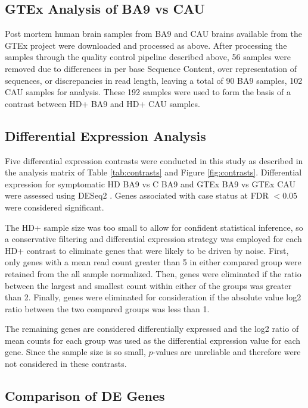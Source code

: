 \documentclass[fleqn,10pt,table]{wlscirep}
\begin{document}
\subsection{GTEx Analysis of BA9 vs CAU}
Post mortem human brain samples from BA9 and CAU brains available from the GTEx project \cite{Carithers2015-vh} were downloaded and processed as above.
After processing the samples through the quality control pipeline described above, 56 samples were removed due to differences in per base Sequence Content, over representation of sequences, or discrepancies in read length, leaving a total of 90 BA9 samples, 102 CAU samples for analysis.
These 192 samples were used to form the basis of a contrast between HD+ BA9 and HD+ CAU samples.

\subsection{Differential Expression Analysis}
Five differential expression contrasts were conducted in this study as described in the analysis matrix of Table \ref{tab:contrasts} and Figure \ref{fig:contrasts}.
Differential expression for symptomatic HD BA9 vs C BA9 and GTEx BA9 vs GTEx CAU were assessed using DESeq2 \cite{Love2014-nu}.
Genes associated with case status at FDR $< 0.05$ were considered significant.

The HD+ sample size was too small to allow for confident statistical inference, so a conservative filtering and differential expression strategy was employed for each HD+ contrast to eliminate genes that were likely to be driven by noise.
First, only genes with a mean read count greater than 5 in either compared group were retained from the all sample normalized.
Then, genes were eliminated if the ratio between the largest and smallest count within either of the groups was greater than 2.
Finally, genes were eliminated for consideration if the absolute value log2 ratio between the two compared groups was less than 1.

The remaining genes are considered differentially expressed and the log2 ratio of mean counts for each group was used as the differential expression value for each gene.
Since the sample size is so small, $p$-values are unreliable and therefore were not considered in these contrasts.

\subsection{Comparison of DE Genes}
\end{document}
